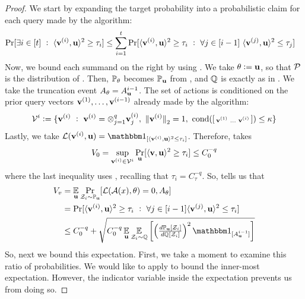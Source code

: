 \begin{proof}
We start by expanding the target probability into a probabilistic claim for each query made by the algorithm:
\begin{align*}
    \Pr[\exists i \in [t] ~:~ \langle \boldsymbol{\mathrm{v}}^{(i)}, \boldsymbol{\mathrm{u}}\rangle^2 \geq \tau_i]
    &\leq \sum_{i=1}^t \Pr[\langle \boldsymbol{\mathrm{v}}^{(i)}, \boldsymbol{\mathrm{u}}\rangle^2 \geq \tau_i ~:~ \forall j\in[i-1] ~ \langle \boldsymbol{\mathrm{v}}^{(j)}, \boldsymbol{\mathrm{u}}\rangle^2 \leq \tau_j]
\end{align*}
Now, we bound each summand on the right by using .
We take \(\theta \;{\vcentcolon=}\; \boldsymbol{\mathrm{u}}\), so that \({\mathcal P}\) is the distribution of \vu.
Then, \({\mathbb P}_\theta\) becomes \({\mathbb P}_{\boldsymbol{\mathrm{u}}}\) from , and \({\mathbb Q}\) is exactly \bbQ as in .
We take the truncation event \(A_\theta = A_{\boldsymbol{\mathrm{u}}}^{i-1}\).
The set of actions \cV is conditioned on the prior query vectors \(\boldsymbol{\mathrm{v}}^{(1)},\ldots,\boldsymbol{\mathrm{v}}^{(i-1)}\) already made by the algorithm:
\[
    \cV^i
    \defeq
    \{
        \vv^{(i)}
        ~:~
        \vv^{(i)} = \otimes_{j=1}^q \vv^{(i)}_j
        ,~
        \norm{\vv^{(i)}}_2=1
        ,~
        \text{cond}(\sbmat{\vv^{(1)} & \ldots & \vv^{(i)}}) \leq \kappa
    \}
\]
Lastly, we take \(\cL(\vv^{(i)},\vu) = \mathbbm1_{[\langle \vv^{(i)}, \vu\rangle^2 \leq \tau_i]}\).
Therefore,  takes
\[
    V_0 = \sup_{\boldsymbol{\mathrm{v}}^{(i)}\in{\mathcal V}^{i}} \Pr_{\boldsymbol{\mathrm{u}}} [\langle \boldsymbol{\mathrm{v}}, \boldsymbol{\mathrm{u}} \rangle^2 \geq \tau_i] \leq C_0^{-q}
\]
where the last inequality uses , recalling that \(\tau_i = C_\tau^{-q}\).
So,  tells us that
\begin{align*}
    V_v
    &= \E_{\vu} \Pr_{\cZ_i\sim\bbP_{\vu}}[\cL(\cA(x), \theta) = 0, A_\theta] \\
    &= \Pr[\langle \vv^{(i)}, \vu\rangle^2 \geq \tau_i ~:~ \forall j\in[i-1] \langle \vv^{(j)}, \vu\rangle^2 \leq \tau_i] \\
    &\leq C_0^{-q} + \sqrt{C_0^{-q}\E_{\vu}\E_{\cZ_i\sim\bbQ}\left[
            \left(\tsfrac{d\bbP_{\vu}[\cZ_i]}{d\bbQ[\cZ_i]}\right)^2
            \mathbbm1_{[A_{\vu}^{i-1}]}
        \right]}
\end{align*}
So, next we bound this expectation.
First, we take a moment to examine this ratio of probabilities.
We would like to apply  to bound the inner-most expectation.
However, the indicator variable inside the expectation prevents us from doing so.

\end{proof}
